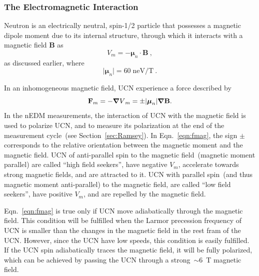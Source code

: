 \subsubsection{The Electromagnetic Interaction}

Neutron is an electrically neutral, spin-1/2 particle that possesses a
magnetic dipole moment due to its internal structure, through which it
interacts with a magnetic field \textbf{B} as
\begin{equation}
  \label{eqn:vmag}
V_m=-\boldsymbol{\mu}_n \cdot \textbf{B}~,
\end{equation}
as discussed earlier, where
\begin{equation}
\vert \boldsymbol{\mu}_n \vert =60 \; \text{neV/T}~.
\end{equation}

In an inhomogeneous magnetic field, UCN experience a force described
by
\begin{equation}
  \label{eqn:fmag}
  {\bf{F}}_m = - {\boldsymbol{\nabla}V}_m = \pm \vert {\boldsymbol{\mu}}_n \vert \boldsymbol{\nabla} \bf{B}.
\end{equation}
In the nEDM measurements, the interaction of UCN with the magnetic
field is used to polarize UCN, and to measure its polarization at the
end of the measurement cycle~(see Section~\ref{sec:Ramsey}). In
Eqn.~\ref{eqn:fmag}, the sign $\pm$ corresponds to the relative
orientation between the magnetic moment and the magnetic field.  UCN
of anti-parallel spin to the magnetic field~(magnetic moment parallel)
are called ``high field seekers'', have negative $V_m$, accelerate
towards strong magnetic fields, and are attracted to it. UCN with
parallel spin~(and thus magnetic moment anti-parallel) to the magnetic
field, are called ``low field seekers'', have positive $V_m$, and
are repelled by the magnetic field.

Eqn.~\ref{eqn:fmag} is true only if UCN move adiabatically through the
magnetic field. This condition will be fulfilled when the Larmor
precession frequency of UCN is smaller than the changes in the
magnetic field in the rest fram of the UCN. However, since the UCN
have low speeds, this condition is easily fulfilled. If the UCN spin
adiabatically traces the magnetic field, it will be fully polarized,
which can be achieved by passing the UCN through a strong~$\sim 6$~T
magnetic field.


